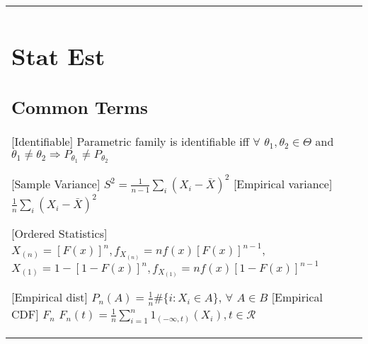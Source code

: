 
\begin{tabulary}{\textwidth}{l || L}

	\section{Stat Est}

	\subsection{Common Terms}

	[Identifiable]
	Parametric family is identifiable iff $\forall$ $\theta_1,
		\theta_2\in\Theta$ and $\theta_1\neq\theta_2\Rightarrow P_{\theta_1}\neq
		P_{\theta_2}$

	[Sample Variance]
	$S^2=\frac{1}{n-1}\sum_i(X_i-\bar{X})^2$
	[Empirical variance] $\frac{1}{n}\sum_i (X_i - \bar{X})^2$

	[Ordered Statistics]
	$X_{(n)}=[F(x)]^n, f_{X_{(n)}}=nf(x)[F(x)]^{n-1}$,
	$X_{(1)}=1-[1-F(x)]^n, f_{X_{(1)}}=nf(x)[1-F(x)]^{n-1}$

	[Empirical dist]
	$P_n(A)=\frac{1}{n}\#\{i: X_i \in A\}$, $\forall$ $A\in B$
	[Empirical CDF]
	$F_n$ $F_n(t) = \frac{1}{n}\sum_{i=1}^n 1_{(-\infty, t)}(X_i), t\in\mathcal{R}$


\end{tabulary}

